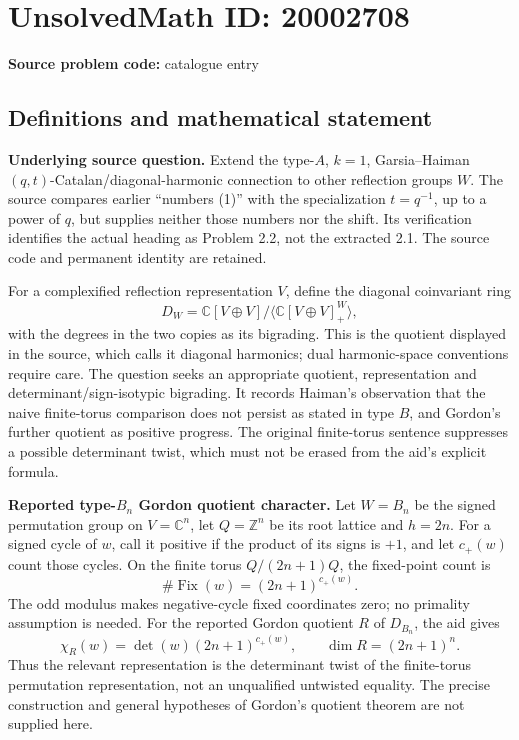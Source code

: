 \documentclass[11pt]{article}
\newcommand{\Z}{\mathbb{Z}}
\newcommand{\C}{\mathbb{C}}
\begin{document}
\section*{UnsolvedMath ID: 20002708}
\textbf{Source problem code:} catalogue entry
\subsection{Definitions and mathematical statement}
\textbf{Underlying source question.} Extend the type-\(A\), \(k=1\), Garsia--Haiman \((q,t)\)-Catalan/diagonal-harmonic connection to other reflection groups \(W\). The source compares earlier ``numbers (1)'' with the specialization \(t=q^{-1}\), up to a power of \(q\), but supplies neither those numbers nor the shift. Its verification identifies the actual heading as Problem 2.2, not the extracted 2.1. The source code and permanent identity are retained.

For a complexified reflection representation \(V\), define the diagonal coinvariant ring
\[
 D_W=\C[V\oplus V]/\langle\C[V\oplus V]^W_+\rangle,
\]
with the degrees in the two copies as its bigrading. This is the quotient displayed in the source, which calls it diagonal harmonics; dual harmonic-space conventions require care. The question seeks an appropriate quotient, representation and determinant/sign-isotypic bigrading. It records Haiman's observation that the naive finite-torus comparison does not persist as stated in type \(B\), and Gordon's further quotient as positive progress. The original finite-torus sentence suppresses a possible determinant twist, which must not be erased from the aid's explicit formula.

\textbf{Reported type-\(B_n\) Gordon quotient character.} Let \(W=B_n\) be the signed permutation group on \(V=\C^n\), let \(Q=\Z^n\) be its root lattice and \(h=2n\). For a signed cycle of \(w\), call it positive if the product of its signs is \(+1\), and let \(c_+(w)\) count those cycles. On the finite torus \(Q/(2n+1)Q\), the fixed-point count is
\[
 \#\operatorname{Fix}(w)=(2n+1)^{c_+(w)}.
\]
The odd modulus makes negative-cycle fixed coordinates zero; no primality assumption is needed. For the reported Gordon quotient \(R\) of \(D_{B_n}\), the aid gives
\[
 \chi_R(w)=\det(w)(2n+1)^{c_+(w)},\qquad
 \dim R=(2n+1)^n.
\]
Thus the relevant representation is the determinant twist of the finite-torus permutation representation, not an unqualified untwisted equality. The precise construction and general hypotheses of Gordon's quotient theorem are not supplied here.
\end{document}
